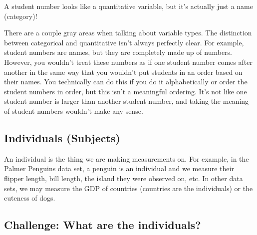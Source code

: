 \documentclass[
  letterpaper,
  DIV=11,
  numbers=noendperiod,
  oneside]{scrreprt}
\begin{document}
\begin{tcolorbox}[enhanced jigsaw, toprule=.15mm, colbacktitle=quarto-callout-warning-color!10!white, title=\textcolor{quarto-callout-warning-color}{\faExclamationTriangle}\hspace{0.5em}{Student Numbers}, arc=.35mm, colframe=quarto-callout-warning-color-frame, colback=white, titlerule=0mm, left=2mm, bottomtitle=1mm, bottomrule=.15mm, breakable, opacitybacktitle=0.6, leftrule=.75mm, toptitle=1mm, coltitle=black, rightrule=.15mm, opacityback=0]

A student number looks like a quantitative variable, but it's actually
just a name (category)!

\end{tcolorbox}

There are a couple gray areas when talking about variable types. The
distinction between categorical and quantitative isn't always perfectly
clear. For example, student numbers are names, but they are completely
made up of numbers. However, you wouldn't treat these numbers as if one
student number comes after another in the same way that you wouldn't put
students in an order based on their names. You technically can do this
if you do it alphabetically or order the student numbers in order, but
this isn't a meaningful ordering. It's not like one student number is
larger than another student number, and taking the meaning of student
numbers wouldn't make any sense.

\hypertarget{individuals-subjects}{%
\subsection{Individuals (Subjects)}\label{individuals-subjects}}

An individual is the thing we are making measurements on. For example,
in the Palmer Penguins data set, a penguin is an individual and we
measure their flipper length, bill length, the island they were observed
on, etc. In other data sets, we may measure the GDP of countries
(countries are the individuals) or the cuteness of
dogs.{}

\hypertarget{challenge-what-are-the-individuals}{%
\subsection{Challenge: What are the
individuals?}\label{challenge-what-are-the-individuals}}
\end{document}
